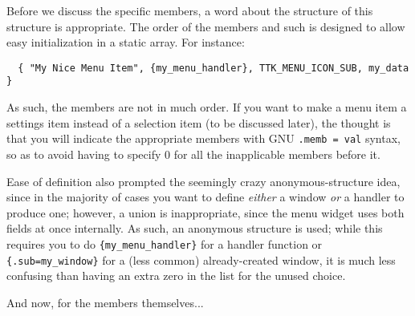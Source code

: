 \documentclass[12pt,letterpaper]{report}
\begin{document}
Before we discuss the specific members, a word about the structure of this structure
is appropriate. The order of the members and such is designed to allow easy initialization
in a static array. For instance:
\begin{verbatim}
  { "My Nice Menu Item", {my_menu_handler}, TTK_MENU_ICON_SUB, my_data }
\end{verbatim}
As such, the members are not in much order. If you want to make a menu item a settings
item instead of a selection item (to be discussed later), the thought is that you will
indicate the appropriate members with GNU \verb|.memb = val| syntax, so as to avoid having
to specify 0 for all the inapplicable members before it.

Ease of definition also prompted the seemingly crazy anonymous-structure idea, since in the
majority of cases you want to define \emph{either} a window \emph{or} a handler to produce one;
however, a union is inappropriate, since the menu widget uses both fields at once internally.
As such, an anonymous structure is used; while this requires you to do \verb|{my_menu_handler}| for
a handler function or \verb|{.sub=my_window}| for a (less common) already-created window,
it is much less confusing than having an extra zero in the list for the unused choice.

And now, for the members themselves...
\end{document}
